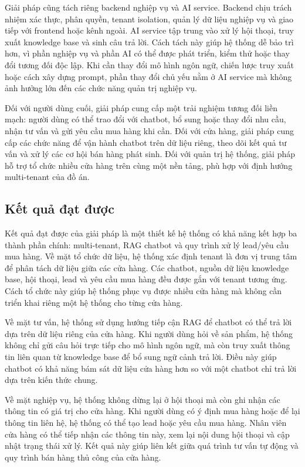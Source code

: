 \documentclass[../DoAn.tex]{subfiles}
\begin{document}
Giải pháp cũng tách riêng backend nghiệp vụ và AI service. Backend chịu trách nhiệm xác thực, phân quyền, tenant isolation, quản lý dữ liệu nghiệp vụ và giao tiếp với frontend hoặc kênh ngoài. AI service tập trung vào xử lý hội thoại, truy xuất knowledge base và sinh câu trả lời. Cách tách này giúp hệ thống dễ bảo trì hơn, vì phần nghiệp vụ và phần AI có thể được phát triển, kiểm thử hoặc thay đổi tương đối độc lập. Khi cần thay đổi mô hình ngôn ngữ, chiến lược truy xuất hoặc cách xây dựng prompt, phần thay đổi chủ yếu nằm ở AI service mà không ảnh hưởng lớn đến các chức năng quản trị nghiệp vụ.

Đối với người dùng cuối, giải pháp cung cấp một trải nghiệm tương đối liền mạch: người dùng có thể trao đổi với chatbot, bổ sung hoặc thay đổi nhu cầu, nhận tư vấn và gửi yêu cầu mua hàng khi cần. Đối với cửa hàng, giải pháp cung cấp các chức năng để vận hành chatbot trên dữ liệu riêng, theo dõi kết quả tư vấn và xử lý các cơ hội bán hàng phát sinh. Đối với quản trị hệ thống, giải pháp hỗ trợ tổ chức nhiều cửa hàng trên cùng một nền tảng, phù hợp với định hướng multi-tenant của đồ án.

\subsection{Kết quả đạt được}
\label{subsection:5.1.3}

Kết quả đạt được của giải pháp là một thiết kế hệ thống có khả năng kết hợp ba thành phần chính: multi-tenant, RAG chatbot và quy trình xử lý lead/yêu cầu mua hàng. Về mặt tổ chức dữ liệu, hệ thống xác định tenant là đơn vị trung tâm để phân tách dữ liệu giữa các cửa hàng. Các chatbot, nguồn dữ liệu knowledge base, hội thoại, lead và yêu cầu mua hàng đều được gắn với tenant tương ứng. Cách tổ chức này giúp hệ thống phục vụ được nhiều cửa hàng mà không cần triển khai riêng một hệ thống cho từng cửa hàng.

Về mặt tư vấn, hệ thống sử dụng hướng tiếp cận RAG để chatbot có thể trả lời dựa trên dữ liệu riêng của cửa hàng. Khi người dùng hỏi về sản phẩm, hệ thống không chỉ gửi câu hỏi trực tiếp cho mô hình ngôn ngữ, mà còn truy xuất thông tin liên quan từ knowledge base để bổ sung ngữ cảnh trả lời. Điều này giúp chatbot có khả năng bám sát dữ liệu cửa hàng hơn so với một chatbot chỉ trả lời dựa trên kiến thức chung.

Về mặt nghiệp vụ, hệ thống không dừng lại ở hội thoại mà còn ghi nhận các thông tin có giá trị cho cửa hàng. Khi người dùng có ý định mua hàng hoặc để lại thông tin liên hệ, hệ thống có thể tạo lead hoặc yêu cầu mua hàng. Nhân viên cửa hàng có thể tiếp nhận các thông tin này, xem lại nội dung hội thoại và cập nhật trạng thái xử lý. Kết quả này giúp liên kết giữa quá trình tư vấn tự động và quy trình bán hàng thủ công của cửa hàng.
\end{document}
